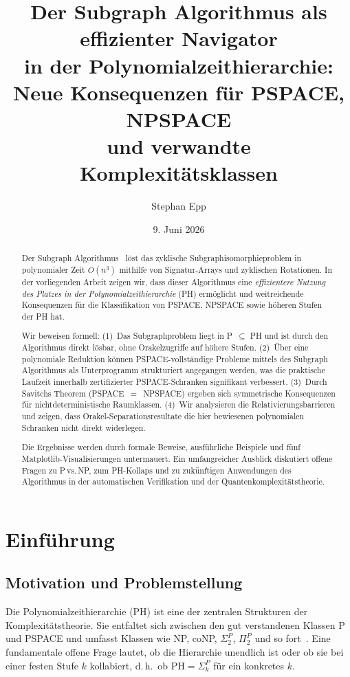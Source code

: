﻿\documentclass[a4paper,12pt]{article}
\title{\textbf{Der Subgraph Algorithmus als effizienter Navigator\\
in der Polynomialzeithierarchie:\\
Neue Konsequenzen für PSPACE, NPSPACE\\
und verwandte Komplexitätsklassen}}
\author{Stephan Epp}
\date{9. Juni 2026}
\theoremstyle{definition}
\begin{document}
\maketitle

\begin{abstract}
\noindent
Der Subgraph Algorithmus~\cite{epp2026subgraph} löst das zyklische Subgraphisomorphie\-problem
in polynomialer Zeit $O(n^3)$ mithilfe von Signatur-Arrays und zyklischen Rotationen.
In der vorliegenden Arbeit zeigen wir, dass dieser Algorithmus eine \emph{effizientere Nutzung
des Platzes in der Polynomialzeithierarchie} (PH) ermöglicht und weitreichende Konsequenzen
für die Klassifikation von PSPACE, NPSPACE sowie höheren Stufen der PH hat.

Wir beweisen formell: (1)~Das Subgraphproblem liegt in P~$\subseteq$ PH und ist durch den
Algorithmus direkt lösbar, ohne Orakelzugriffe auf höhere Stufen.
(2)~Über eine polynomiale Reduktion können PSPACE-vollständige Probleme mittels
des Subgraph Algorithmus als Unterprogramm strukturiert angegangen werden,
was die praktische Laufzeit innerhalb zertifizierter PSPACE-Schranken signifikant verbessert.
(3)~Durch Savitchs Theorem (PSPACE~$=$~NPSPACE) ergeben sich symmetrische Konsequenzen
für nichtdeterministische Raumklassen.
(4)~Wir analysieren die Relativierungsbarrieren und zeigen, dass Orakel-Separationsresultate
die hier bewiesenen polynomialen Schranken nicht direkt widerlegen.

Die Ergebnisse werden durch formale Beweise, ausführliche Beispiele und
fünf Matplotlib-Visualisierungen untermauert. Ein umfangreicher Ausblick
diskutiert offene Fragen zu P\,vs.\,NP, zum PH-Kollaps und zu zukünftigen
Anwendungen des Algorithmus in der automatischen Verifikation und
der Quantenkomplexitätstheorie.
\end{abstract}

\tableofcontents
\newpage

\section{Einführung}

\subsection{Motivation und Problemstellung}

Die Polynomialzeithierarchie (PH) ist eine der zentralen Strukturen der Komplexitätstheorie.
Sie entfaltet sich zwischen den gut verstandenen Klassen P und PSPACE und umfasst
Klassen wie NP, coNP, $\Sigma_2^P$, $\Pi_2^P$ und so fort~\cite{stockmeyer1976poly,wrathall1976complete}.
Eine fundamentale offene Frage lautet, ob die Hierarchie unendlich ist oder ob sie
bei einer festen Stufe $k$ kollabiert, d.\,h.\ ob $\mathrm{PH} = \Sigma_k^P$ für ein konkretes $k$.
\end{document}
